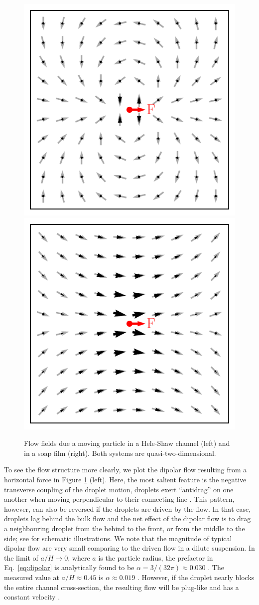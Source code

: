 \begin{figure}%
  \centering
  \includegraphics[width=0.49\columnwidth]{dipolar.pdf}
  \includegraphics[width=0.49\columnwidth]{soap.pdf}
  \caption{Flow fields due a moving particle in a Hele-Shaw channel (left) and in a soap film (right). Both systems are quasi-two-dimensional.}
  \label{fig:q2d}
\end{figure}

To see the flow structure more clearly, we plot the dipolar flow resulting from a horizontal force in Figure \ref{fig:q2d} (left).
Here, the most salient feature is the negative transverse coupling of the droplet motion, \ie droplets exert ``antidrag'' on one another when moving perpendicular to their connecting line \citep{Cui2004}.
This pattern, however, can also be reversed if the droplets are driven by the flow.
In that case, droplets lag behind the bulk flow and the net effect of the dipolar flow is to drag a neighbouring droplet from the behind to the front, or from the middle to the side; see \cite{Beatus2006} for schematic illustrations.
We note that the magnitude of typical dipolar flow are very small comparing to the driven flow in a dilute suspension.
In the limit of $a/H \to 0$, where $a$ is the particle radius, the prefactor in Eq.\ \eqref{eq:dipolar} is analytically found to be $\alpha=3/(32\pi)\approx 0.030$ \citep{LironMochon}.
The measured value at $a/H \approx 0.45$ is $\alpha \approx 0.019$ \citep{Diamant_2005}.
However, if the droplet nearly blocks the entire channel cross-section, the resulting flow will be plug-like and has a constant velocity \citep{q2d_Beatus}.

